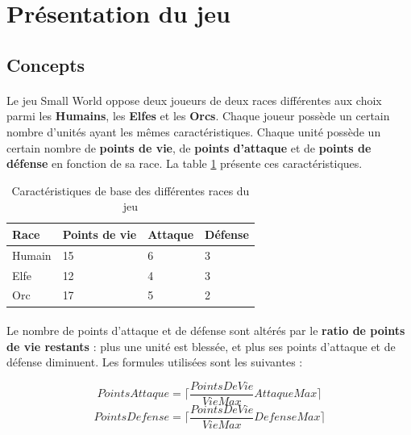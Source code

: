 \section{Présentation du jeu}

\subsection{Concepts}

\paragraph{}
Le jeu Small World oppose deux joueurs de deux races différentes aux choix parmi les \textbf{Humains}, les \textbf{Elfes} et les \textbf{Orcs}.
Chaque joueur possède un certain nombre d'unités ayant les mêmes caractéristiques. Chaque unité possède un certain nombre de \textbf{points de vie}, de \textbf{points d'attaque} et de \textbf{points de défense} en fonction de sa race.
La table \ref{fig:caracteristiques} présente ces caractéristiques.

\begin{table}[h!]
  \centering
  \begin{tabular}{|l|l|l|l|}
    \hline
    Race&Points de vie&Attaque&Défense\\
    \hline
    Humain&15&6&3\\
    \hline
    Elfe&12&4&3\\
    \hline
    Orc&17&5&2\\
    \hline
  \end{tabular}
  \caption{Caractéristiques de base des différentes races du jeu}
  \label{fig:caracteristiques}
\end{table}

\paragraph{}
Le nombre de points d'attaque et de défense sont altérés par le \textbf{ratio de points de vie restants} : plus une unité est blessée, et plus ses points d'attaque et de défense diminuent. Les formules utilisées sont les suivantes :

\begin{displaymath}
  PointsAttaque = \lceil \frac{PointsDeVie}{VieMax} AttaqueMax \rceil
\end{displaymath}
\begin{displaymath}
  PointsDefense = \lceil \frac{PointsDeVie}{VieMax} DefenseMax \rceil
\end{displaymath}

